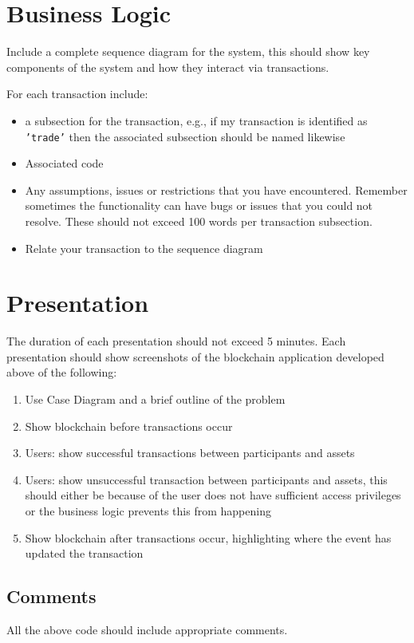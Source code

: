 \section{Business Logic}\label{sec:bl}
Include a complete sequence diagram for the system, this should show key components of the system and how they interact via transactions.

For each transaction include:
\begin{itemize}
	\item a subsection for the transaction, e.g., if my transaction is identified as {\tt'trade'} then the associated subsection should be named likewise
	\item Associated code
	\item Any assumptions, issues or restrictions that you have encountered. Remember sometimes the functionality can have bugs or issues that you could not resolve. These should not exceed 100 words per transaction subsection.
	\item Relate your transaction to the sequence diagram
\end{itemize}



\section{Presentation}\label{sec:pres}
The duration of each presentation should not exceed 5 minutes. Each presentation should show screenshots of the blockchain application developed above of the following:
\begin{enumerate}
	\item Use Case Diagram and a brief outline of the problem
	\item Show blockchain before transactions occur
	\item Users: show successful transactions between participants and assets
	\item Users: show unsuccessful transaction between participants and assets, this should either be because of the user does not have sufficient access privileges or the business logic prevents this from happening
	\item Show blockchain after transactions occur, highlighting where the event has updated the transaction
\end{enumerate}

\subsection{Comments}
All the above code should include appropriate comments.

